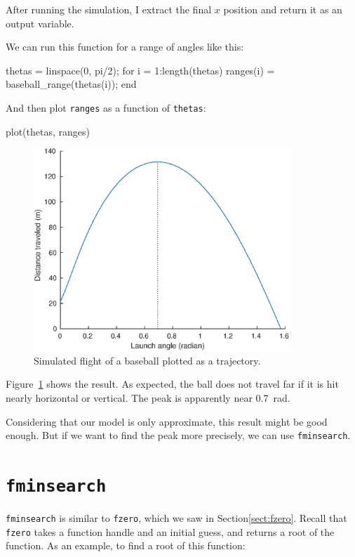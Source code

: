 \documentclass[
]{book}
\numberwithin{Answer}{chapter}
\numberwithin{Exercise}{chapter}
\begin{document}
After running the simulation, I extract the final $x$ position and return it as an output variable.  

We can run this function for a range of angles like this:

\begin{code}
    thetas = linspace(0, pi/2);
    for i = 1:length(thetas)
        ranges(i) = baseball_range(thetas(i));
    end
\end{code}

And then plot {\tt ranges} as a function of {\tt thetas}:

\begin{code}
    plot(thetas, ranges)
\end{code}

\begin{figure}
\centerline{\includegraphics[height=3in]{figs/baseball4.eps}}
\caption{Simulated flight of a baseball plotted as a trajectory.}
\label{fig:baseball4}
\end{figure}

Figure~\ref{fig:baseball4} shows the result.  As expected, the ball does not travel far if it is hit nearly horizontal or vertical. 
The peak is apparently near \SI{0.7}{\radian}.

Considering that our model is only approximate, this result might be good enough.  But if we want to find the peak more precisely, we can use {\tt fminsearch}.


\section{{\tt fminsearch}}

{\tt fminsearch} is similar to {\tt fzero}, which we saw in Section\ref{sect:fzero}.  Recall that {\tt fzero} takes a function handle and an initial guess, and returns a root of the function.
As an example, to find a root of this function:
\end{document}
